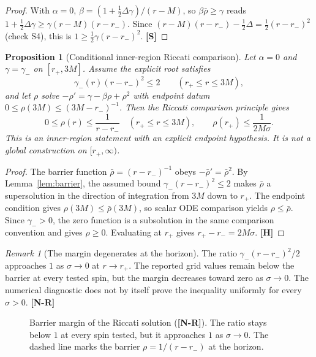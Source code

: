 \documentclass[11pt,a4paper]{article}
\newcommand{\VS}{\textcolor{vs}{\textbf{[S]}}}
\newcommand{\VN}{\textcolor{vn}{\textbf{[N-R]}}}
\newcommand{\VH}{\textcolor{vh}{\textbf{[H]}}}
\newtheorem{proposition}[theorem]{Proposition}
\theoremstyle{remark}
\newtheorem{remark}[theorem]{Remark}
\theoremstyle{definition}
\begin{document}
\begin{proof}
With $\alpha = 0$, $\beta = (1 + \tfrac12\Delta\gamma)/(r-M)$, so $\beta\bar\rho \ge \gamma$ reads $1 + \tfrac12\Delta\gamma \ge \gamma(r-M)(r-r_-)$. Since $(r-M)(r-r_-) - \tfrac12\Delta = \tfrac12(r-r_-)^2$ (check S4), this is $1 \ge \tfrac12\gamma(r-r_-)^2$. \VS
\end{proof}

\begin{proposition}[Conditional inner-region Riccati comparison]
\label{thm:barrier}
Let $\alpha=0$ and $\gamma=\gamma_-$ on $[r_+,3M]$. Assume the explicit root satisfies
\[
\gamma_-(r)(r-r_-)^2\le 2\qquad (r_+\le r\le 3M),
\]
and let $\rho$ solve $-\rho'=\gamma-\beta\rho+\rho^2$ with endpoint datum
$0\le\rho(3M)\le(3M-r_-)^{-1}$. Then the Riccati comparison principle gives
\[
0\le\rho(r)\le\frac{1}{r-r_-}\quad(r_+\le r\le3M),
\qquad \rho(r_+)\le\frac{1}{2M\sigma}.
\]
This is an inner-region statement with an explicit endpoint hypothesis. It is not a global construction on $[r_+,\infty)$.
\end{proposition}

\begin{proof}
The barrier function $\bar\rho=(r-r_-)^{-1}$ obeys $-\bar\rho'=\bar\rho^2$. By Lemma~\ref{lem:barrier}, the assumed bound $\gamma_-(r-r_-)^2\le2$ makes $\bar\rho$ a supersolution in the direction of integration from $3M$ down to $r_+$. The endpoint condition gives $\rho(3M)\le\bar\rho(3M)$, so scalar ODE comparison yields $\rho\le\bar\rho$. Since $\gamma_->0$, the zero function is a subsolution in the same comparison convention and gives $\rho\ge0$. Evaluating at $r_+$ gives $r_+-r_-=2M\sigma$. \VH
\end{proof}

\begin{remark}[The margin degenerates at the horizon]
The ratio $\gamma_-(r-r_-)^2/2$ approaches $1$ as $\sigma\to0$ at $r\to r_+$. The reported grid values remain below the barrier at every tested spin, but the margin decreases toward zero as $\sigma\to0$. The numerical diagnostic does not by itself prove the inequality uniformly for every $\sigma>0$. \VN
\end{remark}

\begin{figure}[H]
\centering
{}
\caption{Barrier margin of the Riccati solution (\VN). The ratio stays below $1$ at every spin tested, but it approaches $1$ as $\sigma\to 0$. The dashed line marks the barrier $\rho = 1/(r-r_-)$ at the horizon.}
\label{fig:margin}
\end{figure}
\end{document}
